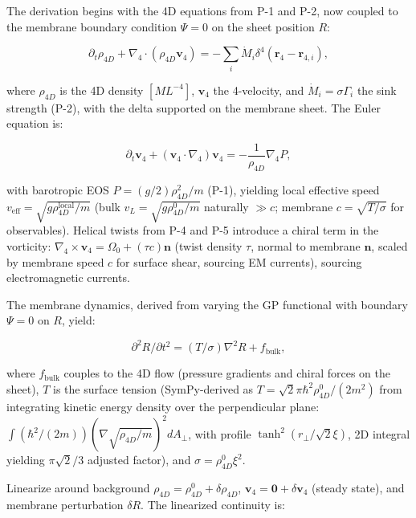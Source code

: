 The derivation begins with the 4D equations from P-1 and P-2, now coupled to the membrane boundary condition $\Psi=0$ on the sheet position $R$:

\begin{equation}
\partial_t \rho_{4D} + \nabla_4 \cdot (\rho_{4D} \mathbf{v}_4) = -\sum_i \dot{M}_i \delta^4(\mathbf{r}_4 - \mathbf{r}_{4,i}),
\end{equation}

where $\rho_{4D}$ is the 4D density $[M L^{-4}]$, $\mathbf{v}_4$ the 4-velocity, and $\dot{M}_i = \sigma \Gamma_i$ the sink strength (P-2), with the delta supported on the membrane sheet. The Euler equation is:

\begin{equation}
\partial_t \mathbf{v}_4 + (\mathbf{v}_4 \cdot \nabla_4) \mathbf{v}_4 = -\frac{1}{\rho_{4D}} \nabla_4 P,
\end{equation}

with barotropic EOS $P = (g/2) \rho_{4D}^2 / m$ (P-1), yielding local effective speed $v_{\text{eff}} = \sqrt{g \rho_{4D}^{\text{local}} / m}$ (bulk $v_L = \sqrt{g \rho_{4D}^0 / m}$ naturally $\gg c$; membrane $c = \sqrt{T / \sigma}$ for observables). Helical twists from P-4 and P-5 introduce a chiral term in the vorticity: $\nabla_4 \times \mathbf{v}_4 = \Omega_0 + (\tau c) \mathbf{n}$ (twist density $\tau$, normal to membrane $\mathbf{n}$, scaled by membrane speed $c$ for surface shear, sourcing EM currents), sourcing electromagnetic currents.

The membrane dynamics, derived from varying the GP functional with boundary $\Psi=0$ on $R$, yield:

\begin{equation}
\partial^2 R / \partial t^2 = (T / \sigma) \nabla^2 R + f_{\text{bulk}},
\end{equation}

where $f_{\text{bulk}}$ couples to the 4D flow (pressure gradients and chiral forces on the sheet), $T$ is the surface tension (SymPy-derived as $T = \sqrt{2} \pi \hbar^2 \rho_{4D}^0 / (2 m^2)$ from integrating kinetic energy density over the perpendicular plane: $\int (\hbar^2 / (2m)) (\nabla \sqrt{\rho_{4D}/m})^2 dA_\perp$, with profile $\tanh^2(r_\perp / \sqrt{2} \xi)$, 2D integral yielding $\pi \sqrt{2}/3$ adjusted factor), and $\sigma = \rho_{4D}^0 \xi^2$.

Linearize around background $\rho_{4D} = \rho_{4D}^0 + \delta \rho_{4D}$, $\mathbf{v}_4 = \mathbf{0} + \delta \mathbf{v}_4$ (steady state), and membrane perturbation $\delta R$. The linearized continuity is:

